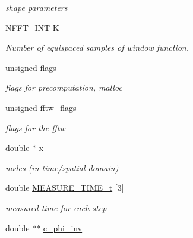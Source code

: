 \begin{DoxyCompactItemize}
\begin{DoxyCompactList}\small\item\em shape parameters \end{DoxyCompactList}\item 
N\-F\-F\-T\-\_\-\-I\-N\-T \hyperlink{structnfct__plan_ac1707afe9f0d6b288a6329bec05048cc}{K}
\begin{DoxyCompactList}\small\item\em Number of equispaced samples of window function. \end{DoxyCompactList}\item 
\hypertarget{structnfct__plan_abde8f7bf8b6003c45b25d7bda1fadf27}{unsigned \hyperlink{structnfct__plan_abde8f7bf8b6003c45b25d7bda1fadf27}{flags}}\label{structnfct__plan_abde8f7bf8b6003c45b25d7bda1fadf27}

\begin{DoxyCompactList}\small\item\em flags for precomputation, malloc \end{DoxyCompactList}\item 
\hypertarget{structnfct__plan_a407c06575335351e1b720b40f8b4f26c}{unsigned \hyperlink{structnfct__plan_a407c06575335351e1b720b40f8b4f26c}{fftw\-\_\-flags}}\label{structnfct__plan_a407c06575335351e1b720b40f8b4f26c}

\begin{DoxyCompactList}\small\item\em flags for the fftw \end{DoxyCompactList}\item 
\hypertarget{structnfct__plan_a5635e780f4c492f087754d71f16e07ed}{double $\ast$ \hyperlink{structnfct__plan_a5635e780f4c492f087754d71f16e07ed}{x}}\label{structnfct__plan_a5635e780f4c492f087754d71f16e07ed}

\begin{DoxyCompactList}\small\item\em nodes (in time/spatial domain) \end{DoxyCompactList}\item 
\hypertarget{structnfct__plan_acd69baad39feaa27f34c063960b173f0}{double \hyperlink{structnfct__plan_acd69baad39feaa27f34c063960b173f0}{M\-E\-A\-S\-U\-R\-E\-\_\-\-T\-I\-M\-E\-\_\-t} \mbox{[}3\mbox{]}}\label{structnfct__plan_acd69baad39feaa27f34c063960b173f0}

\begin{DoxyCompactList}\small\item\em measured time for each step \end{DoxyCompactList}\item 
\hypertarget{structnfct__plan_aa217dda883fc3533b95bf6ab6ccff888}{double $\ast$$\ast$ \hyperlink{structnfct__plan_aa217dda883fc3533b95bf6ab6ccff888}{c\-\_\-phi\-\_\-inv}}\label{structnfct__plan_aa217dda883fc3533b95bf6ab6ccff888}


\end{DoxyCompactItemize}
